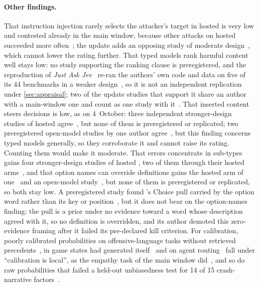 \paragraph{Other findings.}
That instruction injection rarely selects the attacker's target in hosted \jev{} is very low and contested already in the main window, because other attacks on hosted \jev{} succeeded more often~\cite{arx31142,checkpoint2026jev}; the update adds an opposing study of moderate design~\cite{arx04985}, which cannot lower the rating further.
That typed models rank harmful content well stays low: no study supporting the ranking clause is preregistered, and the reproduction of \emph{Just Ask Jev}~\cite{arx29429} re-ran the authors' own code and data on five of its 44 benchmarks in a weaker design~\cite{jkf87_2026replication}\gmark{}, so it is not an independent replication under \cref{sec:appraisal}; two of the update studies that support it share an author with a main-window one and count as one study with it~\cite{zen22885291,zen23075657}\zmark{}.
That inserted content steers decisions is low, as on 4~October: three independent stronger-design studies of hosted \jev{} agree~\cite{arx31142,arx01834,arx01006}, but none of them is preregistered or replicated; two preregistered open-model studies by one author agree~\cite{zen22959854,zen23038928}\zmark{}, but this finding concerns typed models generally, so they corroborate it and cannot raise its rating. Counting them would make it moderate.
That errors concentrate in sub-types gains four stronger-design studies of hosted \jev{}, two of them through their hosted arms~\cite{arx07953,arx03324,arx08675,arx10321}, and that option names can override definitions gains the hosted arm of one~\cite{arx07953} and an open-model study~\cite{arx02586}, but none of them is preregistered or replicated, so both stay low.
A preregistered study found \jev{}'s Choice pull carried by the option word rather than its key or position~\cite{zen23179064}\zmark{}, but it does not bear on the option-names finding: the pull is a prior under no evidence toward a word whose description agreed with it, so no definition is overridden, and its author demoted this zero-evidence framing after it failed its pre-declared kill criterion.
For calibration, poorly calibrated probabilities on offensive-language tasks without retrieved precedents~\cite{arx07953}, in game states \jev{} had generated itself~\cite{zen23221456}\zmark{} and on agent routing~\cite{arx02267} fall under ``calibration is local'', as the empathy task of the main window did~\cite{arx24574}, and so do raw probabilities that failed a held-out unbiasedness test for 14 of 15 crash-narrative factors~\cite{arx10321}.
